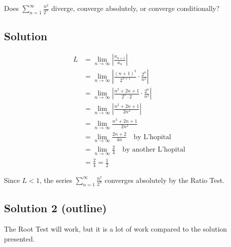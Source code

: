 \documentclass{article}
\begin{document}
\noindent
Does $\displaystyle \sum_{n=1}^\infty \frac{n^2}{2^n}$
diverge, converge absolutely, or converge conditionally?

\subsection*{Solution}

\begin{align*}
L&=\lim_{n \to \infty} \left|\frac{a_{n+1}}{a_n}\right|\\
&= \lim_{n \to \infty} \left| \frac{(n+1)^2}{2^{n+1}} \cdot \frac{2^n}{n^2}\right|\\
&= \lim_{n \to \infty} \left| \frac{n^2+2n+1}{2^n \cdot 2} \cdot \frac{2^n}{n^2}\right|\\
&= \lim_{n \to \infty} \left| \frac{n^2+2n+1}{2n^2}\right|\\
&= \lim_{n \to \infty} \frac{n^2+2n+1}{2n^2}\\
&= \lim_{n \to \infty} \frac{2n+2}{4n}\quad\text{by L'hopital}\\
&= \lim_{n \to \infty} \frac{2}{4}\quad\text{by another L'hopital}\\
&= \frac24=\frac12
\end{align*}

Since $L< 1$, the series $\displaystyle \sum_{n=1}^\infty \frac{n^2}{2^n}$ converges absolutely by the Ratio Test.


\subsection*{Solution 2 (outline)}

The Root Test will work, but it is a lot of work compared to the solution presented.
\end{document}
